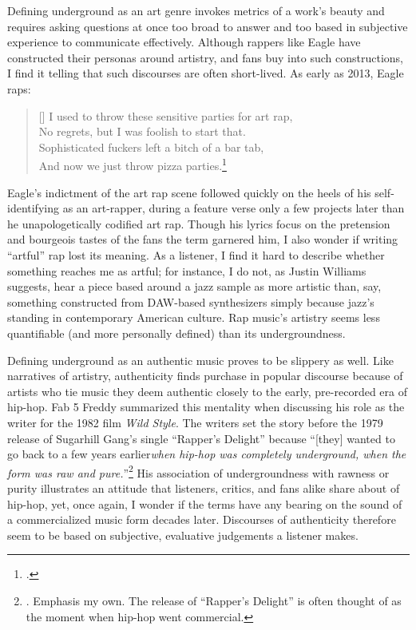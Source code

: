 Defining underground as an art genre invokes metrics of a work's beauty and requires asking
questions at once too broad to answer and too based in subjective experience to communicate
effectively. Although rappers like Eagle have constructed their personas around artistry, and 
fans buy into such constructions, I find it telling that such discourses are often short-lived.
As early as 2013, Eagle raps:
\settowidth{\versewidth}{I used to throw these sensitive parties for art rap,}
    \begin{verse}[\versewidth]
        \small I used to throw these sensitive parties for art rap, \\
        \small No regrets, but I was foolish to start that. \\
        \small Sophisticated fuckers left a bitch of a bar tab, \\
        \small And now we just throw pizza parties.\footnote{
        \cite{milo2013}.}
    \end{verse}
Eagle's indictment of the art rap scene followed quickly on the heels of his self-identifying
as an art-rapper, during a feature verse only a few projects later than he unapologetically
codified art rap. Though his lyrics focus on the pretension and bourgeois tastes of the fans
the term garnered him, I also  wonder if writing ``artful'' rap lost its meaning. As a listener,
I find it hard to describe whether something reaches me as artful; for instance, I do not, as
Justin Williams suggests, hear a piece based around a jazz sample as more artistic than, say,
something constructed from DAW-based synthesizers simply because jazz's standing in contemporary
American culture. Rap music's artistry seems less quantifiable (and more personally defined) 
than its undergroundness.

Defining underground as an authentic music proves to be slippery as well. Like narratives of
artistry, authenticity finds purchase in popular discourse because of artists who tie music
they deem authentic closely to the early, pre-recorded era of hip-hop. Fab 5 Freddy summarized 
this mentality when discussing  his role as the writer for the 1982 film \textit{Wild Style}. 
The writers set the story before the 1979 release of Sugarhill Gang's single ``Rapper's Delight'' 
because ``[they] wanted to go back to a few years earlier\textellipsis \emph{when hip-hop was 
completely underground, when the form was raw and pure.}''\footnote{
    \autocite[23]{justinawilliamsRhyminStealinMusical2013}. Emphasis my own. The release
    of ``Rapper's Delight'' is often thought of as the moment when hip-hop went commercial.}
His association of undergroundness with rawness or purity illustrates an attitude that
listeners, critics, and fans alike share about of hip-hop, yet, once again, I wonder if the
terms have any bearing on the sound of a commercialized music form decades later.  Discourses
of authenticity therefore seem to be based on subjective, evaluative judgements a listener makes.

